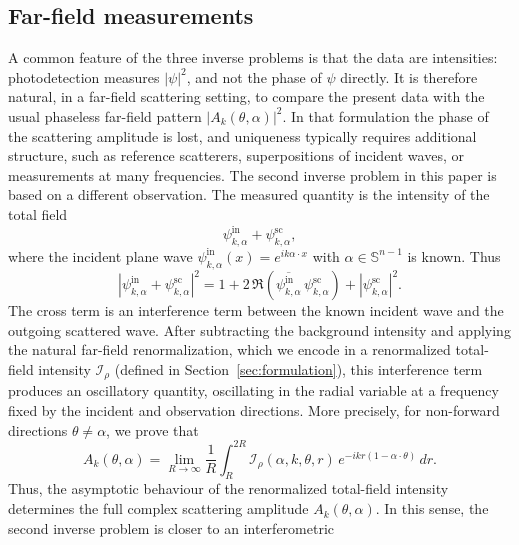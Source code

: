 \documentclass[12pt,a4paper]{amsart}
\numberwithin{equation}{section}
\theoremstyle{plain}
\theoremstyle{definition}
\begin{document}
\subsection{Far-field measurements}
A common feature of the three inverse problems is that the data are
intensities: photodetection measures $|\psi|^2$, and not the phase of
$\psi$ directly. It is therefore natural, in a far-field scattering setting,
to compare the present data with the usual phaseless far-field pattern
$|A_k(\theta,\alpha)|^2$. In that formulation the phase of the scattering
amplitude is lost, and uniqueness typically requires additional structure,
such as reference scatterers, superpositions of incident waves, or
measurements at many frequencies.
The second inverse problem in this paper is based on a different observation.
The measured quantity is the intensity of the total field
\begin{equation*}
    \psi^{\mathrm{in}}_{k,\alpha}
    +
    \psi^{\mathrm{sc}}_{k,\alpha},
\end{equation*}
where the incident plane wave $\psi^{\mathrm{in}}_{k,\alpha}(x)=e^{ik\alpha\cdot x}$ with $\alpha \in \mathbb{S}^{n-1}$ is known. Thus
\begin{equation*}
    \left|
        \psi^{\mathrm{in}}_{k,\alpha}
        +
        \psi^{\mathrm{sc}}_{k,\alpha}
    \right|^2
    =
    1
    +
    2\,\Re\left(
        \overline{\psi^{\mathrm{in}}_{k,\alpha}}\,
        \psi^{\mathrm{sc}}_{k,\alpha}
    \right)
    +
    \left|\psi^{\mathrm{sc}}_{k,\alpha}\right|^2 .
\end{equation*}
The cross term is an interference term between the known incident wave and
the outgoing scattered wave. After subtracting the background intensity and
applying the natural far-field renormalization, which we encode in a
renormalized total-field intensity $\mathcal I_\rho$
(defined in Section~\ref{sec:formulation}), this interference term produces an
oscillatory quantity, oscillating in the radial variable at a frequency fixed
by the incident and observation directions. More precisely, for non-forward
directions $\theta\neq\alpha$, we prove that
\begin{equation*}
    A_k(\theta,\alpha)
    =
    \lim_{R\to\infty}
    \frac{1}{R}
    \int_R^{2R}
    \mathcal I_\rho(\alpha,k,\theta,r)\,
    e^{-ikr(1-\alpha\cdot\theta)}\,dr .
\end{equation*}
Thus, the asymptotic behaviour of the renormalized total-field intensity
determines the full complex scattering amplitude $A_k(\theta,\alpha)$.
In this sense, the second inverse problem is closer to an interferometric
\end{document}
